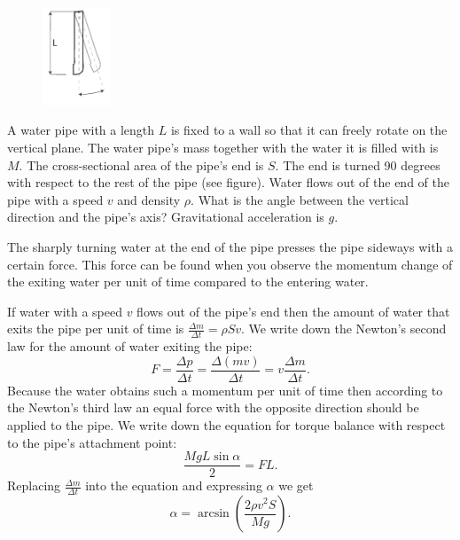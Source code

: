 {\ifEngStatement
\begin{figure}
  \vspace{-35pt}
  \begin{center}
    \includegraphics[width=0.18\textwidth]{2015-v2g-05-toru}
  \end{center}
  \vspace*{-10pt}
\end{figure}
A water pipe with a length $L$ is fixed to a wall so that it can freely rotate on the vertical plane. The water pipe’s mass together with the water it is filled with is $M$. The cross-sectional area of the pipe’s end is $S$. The end is turned 90 degrees with respect to the rest of the pipe (see figure). Water flows out of the end of the pipe with a speed $v$ and density $\rho$. What is the angle between the vertical direction and the pipe’s axis? Gravitational acceleration is $g$.
\fi


\ifEngHint
The sharply turning water at the end of the pipe presses the pipe sideways with a certain force. This force can be found when you observe the momentum change of the exiting water per unit of time compared to the entering water.
\fi


\ifEngSolution
If water with a speed $v$ flows out of the pipe’s end then the amount of water that exits the pipe per unit of time is $\frac{\Delta m}{\Delta t}=\rho S v$. We write down the Newton’s second law for the amount of water exiting the pipe:
\[ F=\frac{\Delta p}{\Delta t}=\frac{\Delta(mv)}{\Delta t}=v \frac{\Delta m}{\Delta t}. \] 
Because the water obtains such a momentum per unit of time then according to the Newton’s third law an equal force with the opposite direction should be applied to the pipe. We write down the equation for torque balance with respect to the pipe’s attachment point:
\[ \frac{MgL\sin \alpha}{2}=FL. \] 
Replacing $\frac{\Delta m}{\Delta t}$ into the equation and expressing $\alpha$ we get
\[ \alpha=\arcsin (\frac{2\rho v^2 S}{Mg}). \]
\fi
}